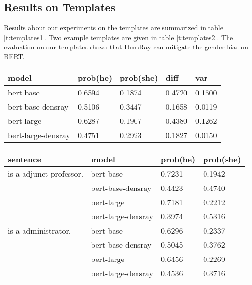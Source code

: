 \subsection{Results on Templates}
Results about our experiments on the templates are summarized in table \ref{t:templates1}. Two example templates are given in table \ref{t:templates2}. The evaluation on our templates shows that DensRay can mitigate the gender bias on BERT.
\begin{table*}[ht]
\centering
\begin{tabular}{lllll}
\hline
model & prob(he) & prob(she) & diff & var\\
\hline
bert-base & 0.6594 & 0.1874 & 0.4720 & 0.1600 \\
bert-base-densray & 0.5106 & 0.3447 & {0.1658} & 0.0119\\
\hline
bert-large  & 0.6287 & 0.1907 & 0.4380 & 0.1262 \\
bert-large-densray  & 0.4751 & 0.2923 & {0.1827} & 0.0150\\
\hline
\end{tabular}
\caption{\label{t:templates1}
BERT debiasing results on templates. \textit{bert-base} and \textit{bert-large} are the original model without debiasing. \textit{prob(he)} is the mean probability that model predict \textit{he} as the [MASK]in all templates. \textit{var} is the variance of the differences between the probability of BERT predicts [MASK] as \textit{he} and \textit{she}.}
\end{table*}
\begin{table*}[ht]
\centering
\begin{tabular}{llll}
\hline
sentence & model & prob(he) & prob(she)\\
\hline
[MASK] is a adjunct professor. & bert-base & 0.7231 & 0.1942\\
 & bert-base-densray & 0.4423 & 0.4740\\
 & bert-large & 0.7181 & 0.2212\\
 & bert-large-densray & 0.3974 & 0.5316\\
\hline
[MASK] is a administrator. & bert-base & 0.6296 & 0.2337\\
 & bert-base-densray & 0.5045 & 0.3762\\
 & bert-large & 0.6456 & 0.2269\\
 & bert-large-densray & 0.4536 & 0.3716\\
\hline
\end{tabular}
\caption{\label{t:templates2}
Sanity check on the templates.}
\end{table*}

